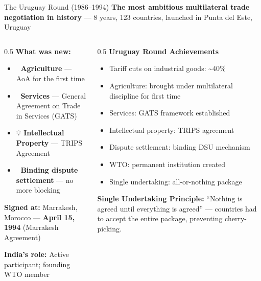 \documentclass[
  ignorenonframetext,
  aspectratio=169,
]{beamer}
\makeatletter
\providecommand{\tightlist}{%
  \setlength{\itemsep}{0pt}\setlength{\parskip}{0pt}}
\let\quarto@originallabel\label
\DeclareRobustCommand*{\label}[1]{\quarto@originallabel{#1}}
\makeatother
\begin{document}
\begin{frame}{The Uruguay Round (1986--1994)}
\label{the-uruguay-round-19861994}
\textbf{The most ambitious multilateral trade negotiation in history}
--- 8 years, 123 countries, launched in Punta del Este, Uruguay

\begin{columns}[T]
\begin{column}{0.5\linewidth}
\textbf{What was new:}

\begin{itemize}
\tightlist
\item
  🌾 \textbf{Agriculture} --- AoA for the first time
\item
  🏢 \textbf{Services} --- General Agreement on Trade in Services (GATS)
\item
  💡 \textbf{Intellectual Property} --- TRIPS Agreement
\item
  🔨 \textbf{Binding dispute settlement} --- no more blocking
\end{itemize}

\textbf{Signed at:} Marrakesh, Morocco --- \textbf{April 15, 1994}
(Marrakesh Agreement)

\textbf{India's role:} Active participant; founding WTO member
\end{column}

\begin{column}{0.5\linewidth}
\textbf{Uruguay Round Achievements}

\begin{itemize}
\tightlist
\item
  Tariff cuts on industrial goods: \textasciitilde40\%
\item
  Agriculture: brought under multilateral discipline for first time
\item
  Services: GATS framework established
\item
  Intellectual property: TRIPS agreement
\item
  Dispute settlement: binding DSU mechanism
\item
  WTO: permanent institution created
\item
  Single undertaking: all-or-nothing package
\end{itemize}

\textbf{Single Undertaking Principle:} ``Nothing is agreed until
everything is agreed'' --- countries had to accept the entire package,
preventing cherry-picking.
\end{column}
\end{columns}
\end{frame}
\end{document}
